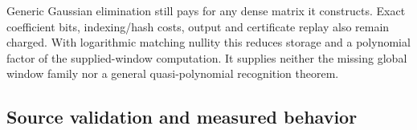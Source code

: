 Generic Gaussian elimination still pays for any dense matrix it constructs.
Exact coefficient bits, indexing/hash costs, output and certificate replay
also remain charged. With logarithmic matching nullity this reduces
storage and a polynomial factor of the supplied-window computation. It
supplies neither the missing global window family nor a general
quasi-polynomial recognition theorem.

\subsection{Source validation and measured behavior}

